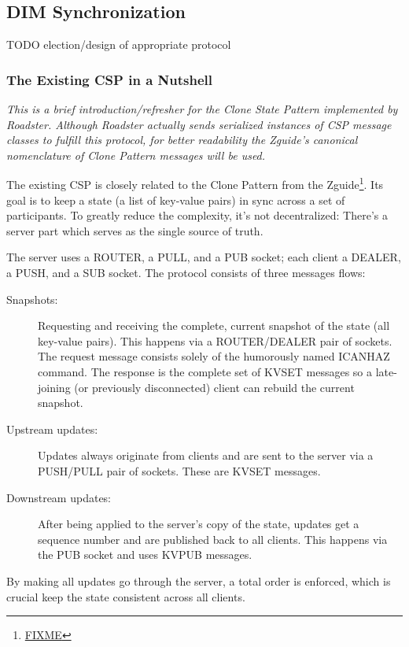 \subsection{DIM Synchronization}
TODO election/design of appropriate protocol\\

\subsubsection{The Existing CSP in a Nutshell}
\emph{This is a brief introduction/refresher for the Clone State Pattern
implemented by Roadster. Although Roadster actually sends serialized instances
of CSP message classes to fulfill this protocol, for better readability the
Zguide's canonical nomenclature of Clone Pattern messages will be used.}

The existing CSP is closely related to the Clone Pattern from the Zguide\footnote{\url{FIXME}}. Its
goal is to keep a state (a list of key-value pairs) in sync across a set of
participants. To greatly reduce the complexity, it's not decentralized: There's
a server part which serves as the single source of truth.

The server uses a ROUTER, a PULL, and a PUB socket; each client a DEALER, a
PUSH, and a SUB socket. The protocol consists of three messages flows:

\begin{description}
	\item [Snapshots:]
		Requesting and receiving the complete, current snapshot of the
		state (all key-value pairs). This happens via a
		ROUTER/DEALER pair of sockets. The request message consists solely of
		the humorously named ICANHAZ command. The response is the
		complete set of KVSET messages so a late-joining (or previously
		disconnected) client can rebuild the current snapshot.

	\item [Upstream updates:]
		Updates always originate from clients and are sent to the
		server via a PUSH/PULL pair of sockets. These are KVSET messages.

	\item [Downstream updates:]
		After being applied to the server's copy of the state,
		updates get a sequence number and are published back to all
		clients. This happens via the PUB socket and
		uses KVPUB messages.
\end{description}

By making all updates go through the server, a total order is enforced,
which is crucial keep the state consistent across all clients.

